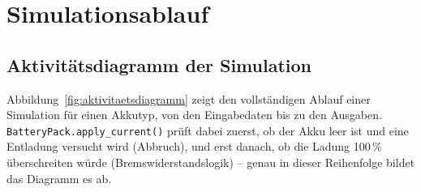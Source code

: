 \chapter{Simulationsablauf}
\label{ch:simulation}

\section{Aktivitätsdiagramm der Simulation}

Abbildung~\ref{fig:aktivitaetsdiagramm} zeigt den vollständigen Ablauf einer Simulation für einen Akkutyp, von den Eingabedaten bis zu den Ausgaben. \texttt{BatteryPack.apply\_current()} prüft dabei zuerst, ob der Akku leer ist und eine Entladung versucht wird (Abbruch), und erst danach, ob die Ladung 100\,\% überschreiten würde (Bremswiderstandslogik) -- genau in dieser Reihenfolge bildet das Diagramm es ab.

